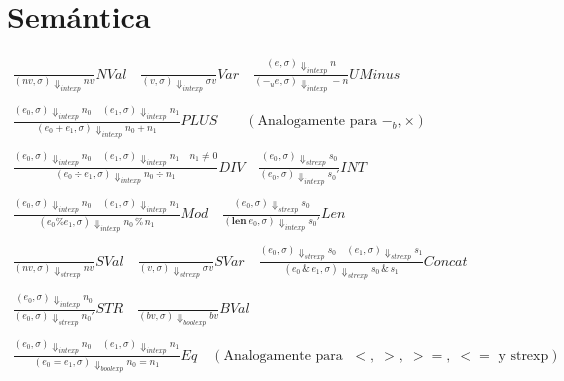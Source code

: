 \documentclass{article}
\begin{document}
\section{Semántica}
\begin{align*}
    \frac{}{(nv, \sigma) \Downarrow_{intexp} nv} NVal \quad
    \frac{}{(v, \sigma) \Downarrow_{intexp} \sigma v} Var \quad
    \frac{(e, \sigma)\Downarrow_{intexp} n}
         {(-_{u}e, \sigma) \Downarrow_{intexp} -n} UMinus \\~\\
    \frac{(e_0, \sigma) \Downarrow _{intexp}n_0 \quad (e_1,\sigma) \Downarrow_{intexp} n_1}
         {(e_0 + e_1, \sigma)\Downarrow _{intexp}n_0 + n_1} PLUS \qquad (\text{Analogamente para }-_b, \times) \\~\\
    \frac{(e_0, \sigma) \Downarrow _{intexp}n_0 \quad (e_1,\sigma) \Downarrow_{intexp} n_1 \quad n_1\neq 0}
         {(e_0 \div e_1, \sigma)\Downarrow _{intexp}n_0 \div n_1} DIV \quad 
    \frac{(e_0, \sigma)\Downarrow_{strexp} s_0}{(e_0,\sigma)\Downarrow_{intexp} {s_0}'} INT\\~\\ 
    \frac{(e_0, \sigma)\Downarrow_{intexp} n_0 \quad (e_1, \sigma)\Downarrow_{intexp} n_1}
         {(e_0 \% e_1, \sigma)\Downarrow _{intexp} n_0 \, \% \, n_1} Mod \quad
    \frac{(e_0,\sigma)\Downarrow _{strexp} s_0}
         {(\textbf{len}\:e_0,\sigma)\Downarrow _{intexp} {s_0}'} Len\\~\\
    \frac{}{(nv, \sigma)\Downarrow _{strexp} nv} SVal \quad
    \frac{}{(v, \sigma)\Downarrow _{strexp}\sigma v} SVar \quad
    \frac{(e_0, \sigma) \Downarrow _{strexp}s_0 \quad (e_1,\sigma) \Downarrow_{strexp} s_1}
         {(e_0\,\&\,e_1, \sigma)\Downarrow _{strexp}s_0 \, \& \, s_1} Concat \\~\\
    \frac{(e_0, \sigma) \Downarrow _{intexp}n_0}
         {(e_0, \sigma)\Downarrow _{strexp}{n_0}'} STR \quad
    \frac{}{(bv, \sigma)\Downarrow _{boolexp}bv} BVal \\~\\
    \frac{(e_0,\sigma)\Downarrow _{intexp} n_0 \quad (e_1,\sigma)\Downarrow _{intexp} n_1}
         {(e_0 = e_1, \sigma)\Downarrow _{boolexp} n_0 = n_1} Eq \quad (\text{Analogamente para }\; <, \;>,\;>=,\;<=\text{ y strexp}) \\~\\

\end{align*}
\end{document}

